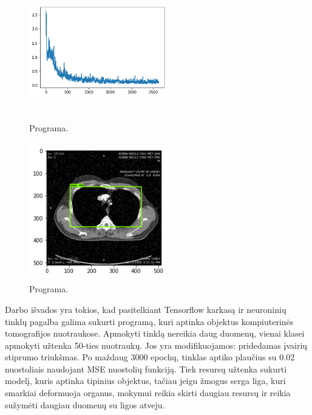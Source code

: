 \documentclass{VUMIFInfKursinis}
\begin{document}
\begin{figure}[ht]
  \centering
  \includegraphics[width=6cm,height=6cm,keepaspectratio]{normalizuotas.png}
  \caption{Programa.}
  \label{fig:kaukė1}
\end{figure}

\begin{figure}[ht]
  \centering
  \includegraphics[width=6cm,height=6cm,keepaspectratio]{result1.png}
  \caption{Programa.}
  \label{fig:kaukė1}
\end{figure}

\par
Darbo išvados yra tokios, kad pasitelkiant Tensorflow karkasą ir neuroninių tinklų pagalba galima sukurti programą,
kuri aptinka objektus kompiuterinės tomografijos nuotraukose. Apmokyti tinklą
nereikia daug duomenų, vienai klasei apmokyti užtenka 50-ties nuotraukų.
Jos yra modifikuojamos: pridedamas įvairių stiprumo triukšmas. Po maždaug 3000 epochų,
tinklas aptiko plaučius su 0.02 nuostoliais naudojant MSE nuostolių funkciją.
Tiek resursų užtenka sukurti modelį, kuris aptinka tipinius objektus, tačiau jeigu žmogus serga liga, kuri smarkiai deformuoja organus, mokymui reikia skirti daugiau resursų ir reikia sužymėti daugiau duomenų su ligos atveju.
\end{document}
